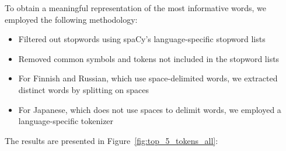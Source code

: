 \documentclass[11pt]{article}
\begin{document}
\begin{enumerate}
    To obtain a meaningful representation of the most informative words, we employed the following methodology:
    \begin{itemize}
        \item Filtered out stopwords using spaCy's language-specific stopword lists
        \item Removed common symbols and tokens not included in the stopword lists
        \item For Finnish and Russian, which use space-delimited words, we extracted distinct words by splitting on spaces
        \item For Japanese, which does not use spaces to delimit words, we employed a language-specific tokenizer
    \end{itemize}

    The results are presented in Figure~\ref{fig:top_5_tokens_all}:


\end{enumerate}
\end{document}

